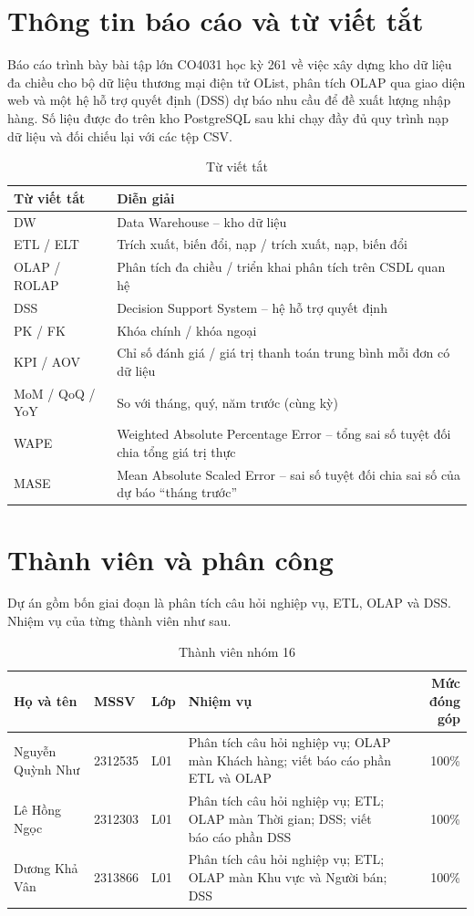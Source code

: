 \section*{Thông tin báo cáo và từ viết tắt}
Báo cáo trình bày bài tập lớn CO4031 học kỳ 261 về việc xây dựng kho dữ liệu đa chiều cho bộ dữ liệu thương mại điện tử OList, phân tích OLAP qua giao diện web và một hệ hỗ trợ quyết định (DSS) dự báo nhu cầu để đề xuất lượng nhập hàng. Số liệu được đo trên kho PostgreSQL sau khi chạy đầy đủ quy trình nạp dữ liệu và đối chiếu lại với các tệp CSV.

\begin{table}[H]\centering\small
\begin{tabularx}{\linewidth}{lY}
\toprule Từ viết tắt & Diễn giải\\\midrule
DW & Data Warehouse -- kho dữ liệu\\
ETL / ELT & Trích xuất, biến đổi, nạp / trích xuất, nạp, biến đổi\\
OLAP / ROLAP & Phân tích đa chiều / triển khai phân tích trên CSDL quan hệ\\
DSS & Decision Support System -- hệ hỗ trợ quyết định\\
PK / FK & Khóa chính / khóa ngoại\\
KPI / AOV & Chỉ số đánh giá / giá trị thanh toán trung bình mỗi đơn có dữ liệu\\
MoM / QoQ / YoY & So với tháng, quý, năm trước (cùng kỳ)\\
WAPE & Weighted Absolute Percentage Error -- tổng sai số tuyệt đối chia tổng giá trị thực\\
MASE & Mean Absolute Scaled Error -- sai số tuyệt đối chia sai số của dự báo ``tháng trước''\\
\bottomrule\end{tabularx}
\caption{Từ viết tắt}
\end{table}
\clearpage
\section*{Thành viên và phân công}
Dự án gồm bốn giai đoạn là phân tích câu hỏi nghiệp vụ, ETL, OLAP và DSS. Nhiệm vụ của từng thành viên như sau.

\begin{table}[H]\centering\small
\begin{tabularx}{\linewidth}{l l l Y r}
\toprule Họ và tên & MSSV & Lớp & Nhiệm vụ & Mức đóng góp\\\midrule
Nguyễn Quỳnh Như & 2312535 & L01 & Phân tích câu hỏi nghiệp vụ; OLAP màn Khách hàng; viết báo cáo phần ETL và OLAP & 100\%\\
Lê Hồng Ngọc & 2312303 & L01 & Phân tích câu hỏi nghiệp vụ; ETL; OLAP màn Thời gian; DSS; viết báo cáo phần DSS & 100\%\\
Dương Khả Vân & 2313866 & L01 & Phân tích câu hỏi nghiệp vụ; ETL; OLAP màn Khu vực và Người bán; DSS & 100\%\\
\bottomrule\end{tabularx}
\caption{Thành viên nhóm 16}
\end{table}
